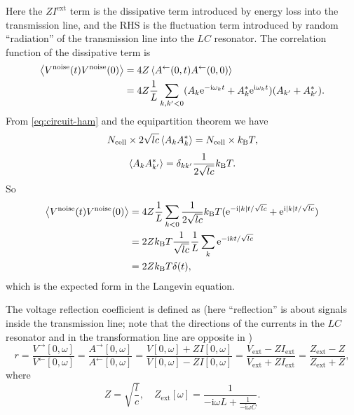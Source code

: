 \documentclass[hyperref, a4paper]{article}
\newcommand*{\ii}{\mathrm{i}}
\newcommand*{\ee}{\mathrm{e}}
\begin{document}
\begin{itemize}
\begin{equation}
    \label{eq:eom-external}
\end{equation}
Here the $Z I^{\text{ext}}$ term is the dissipative term introduced by 
energy loss into the transmission line,
and the RHS is the fluctuation term introduced by random ``radiation''
of the transmission line into the $LC$ resonator.
The correlation function of the dissipative term is 
\[
    \begin{aligned}
        \expval{V^{\text{noise}}(t) V^{\text{noise}}(0)} &= 4Z \expval{A^{\leftarrow}(0, t) A^{\leftarrow}(0, 0)} \\
        &= 4 Z \frac{1}{L} \sum_{k, k' < 0} (A_k \ee^{- \ii \omega_k t} + A_k^* \ee^{\ii \omega_k t})
        (A_{k'} + A_{k'}^*).
    \end{aligned}
\]
From \eqref{eq:circuit-ham} and the equipartition theorem we have 
\[
    N_{\text{cell}} \times 2 \sqrt{lc} \expval{A_k A_{k}^*} = N_{\text{cell}} \times k_{\text{B}} T,
\]
\begin{equation}
    \expval{A_k A_{k'}^*} = \delta_{k k'} \frac{1}{2 \sqrt{lc}} k_{\text{B}} T.
\end{equation}
So 
\begin{equation}
    \begin{aligned}
        \expval{V^{\text{noise}}(t) V^{\text{noise}}(0)} &= 
        4 Z \frac{1}{L} \sum_{k < 0} \frac{1}{2 \sqrt{lc}} k_{\text{B}} T 
        (\ee^{- \ii \abs{k} t / \sqrt{lc} } + \ee^{\ii \abs{k} t / \sqrt{lc} }) \\
        &= 2 Z k_{\text{B}} T \frac{1}{\sqrt{lc}} \frac{1}{L} \sum_k \ee^{- \ii k t / \sqrt{lc}} \\
        &= 2 Z k_{\text{B}} T \delta(t),
    \end{aligned}
\end{equation}
which is the expected form in the Langevin equation.

The voltage reflection coefficient is defined as 
(here ``reflection'' is about signals inside the transmission line;
note that the directions of the currents in the $LC$ resonator 
and in the transformation line are opposite in )
\begin{equation}
    r = \frac{V^{\rightarrow} [0, \omega]}{V^{\leftarrow} [0, \omega]} 
    = \frac{A^{\rightarrow} [0, \omega]}{A^{\leftarrow} [0, \omega]} 
    = \frac{V[0, \omega] + Z I[0, \omega]}{V[0, \omega] - Z I[0, \omega]}
    = \frac{V_{\text{ext}} - Z I_{\text{ext}}}{V_{\text{ext}} + Z I_{\text{ext}}} 
    = \frac{Z_{\text{ext}} - Z}{Z_{\text{ext}} + Z},
\end{equation}
where 
\begin{equation}
    Z = \sqrt{\frac{l}{c}}, \quad Z_{\text{ext}}[\omega] = \frac{1}{- \ii \omega L + \frac{1}{- \ii \omega C}}.
\end{equation}

\end{itemize}
\end{document}
